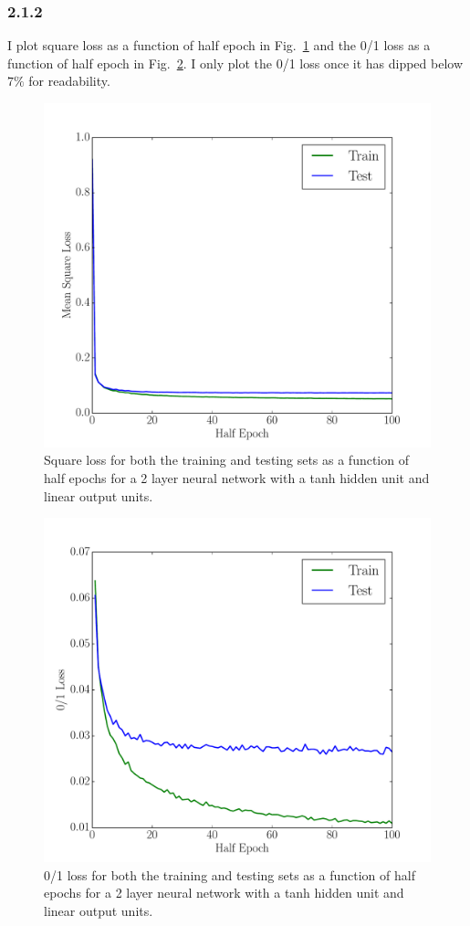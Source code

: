 \documentclass[12pt]{amsart}
\begin{document}
\subsubsection*{2.1.2}
I plot square loss as a function of half epoch in Fig.~\ref{fig:tanh_linear_sq} and the 0/1 loss as a function of half epoch in Fig.~\ref{fig:tanh_linear_01}.  I only plot the 0/1 loss once it has dipped below $7\%$ for readability.
\begin{figure}[H]
	\includegraphics[width=\columnwidth]{tanh_linear_sq.pdf}
    \caption{Square loss for both the training and testing sets as a function of half epochs for a 2 layer neural network with a tanh hidden unit and linear output units.}
    \label{fig:tanh_linear_sq}
\end{figure}
\begin{figure}[H]
	\includegraphics[width=\columnwidth]{tanh_linear_01.pdf}
    \caption{0/1 loss for both the training and testing sets as a function of half epochs for a 2 layer neural network with a tanh hidden unit and linear output units.}
    \label{fig:tanh_linear_01}
\end{figure}
\end{document}
